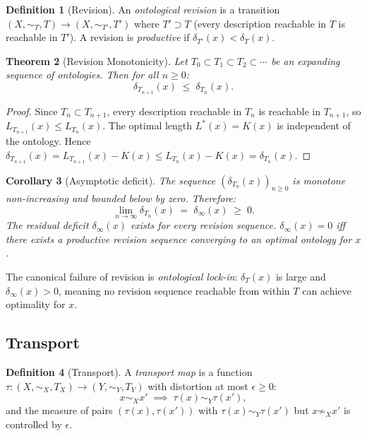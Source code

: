 \documentclass[12pt, a4paper]{article}
\theoremstyle{plain}
\newtheorem{theorem}{Theorem}[section]
\newtheorem{corollary}[theorem]{Corollary}
\theoremstyle{definition}
\newtheorem{definition}[theorem]{Definition}
\theoremstyle{remark}
\newcommand{\eps}{\epsilon}
\begin{document}
\begin{definition}[Revision]
An \emph{ontological revision} is a transition $(X,\sim_T,T)\to(X,\sim_{T'},T')$
where $T'\supset T$ (every description reachable in $T$ is reachable in $T'$).
A revision is \emph{productive} if $\delta_{T'}(x)<\delta_T(x)$.
\end{definition}

\begin{theorem}[Revision Monotonicity]
\label{thm:revision-mono}
Let $T_0\subset T_1\subset T_2\subset\cdots$ be an expanding sequence of
ontologies. Then for all $n\ge 0$:
\[
  \delta_{T_{n+1}}(x) \;\le\; \delta_{T_n}(x).
\]
\end{theorem}

\begin{proof}
Since $T_n\subset T_{n+1}$, every description reachable in $T_n$ is reachable
in $T_{n+1}$, so $L_{T_{n+1}}(x)\le L_{T_n}(x)$. The optimal length
$L^*(x)=K(x)$ is independent of the ontology. Hence
$\delta_{T_{n+1}}(x)=L_{T_{n+1}}(x)-K(x)\le L_{T_n}(x)-K(x)=\delta_{T_n}(x)$.
\end{proof}

\begin{corollary}[Asymptotic deficit]
\label{cor:asymptotic}
The sequence $(\delta_{T_n}(x))_{n\ge 0}$ is monotone non-increasing and
bounded below by zero. Therefore:
\[
  \lim_{n\to\infty}\delta_{T_n}(x) \;=\; \delta_\infty(x) \;\ge\; 0.
\]
The \emph{residual deficit} $\delta_\infty(x)$ exists for every revision
sequence. $\delta_\infty(x)=0$ iff there exists a productive revision
sequence converging to an optimal ontology for $x$.
\end{corollary}

The canonical failure of revision is \emph{ontological lock-in}: $\delta_T(x)$
is large and $\delta_\infty(x)>0$, meaning no revision sequence reachable
from within $T$ can achieve optimality for $x$.

\subsection{Transport}

\begin{definition}[Transport]
\label{def:transport}
A \emph{transport map} is a function
$\tau:(X,\sim_X,T_X)\to(Y,\sim_Y,T_Y)$ with distortion at most $\eps\ge 0$:
\[
  x\sim_X x' \;\implies\; \tau(x)\sim_Y\tau(x'),
\]
and the measure of pairs $(\tau(x),\tau(x'))$ with $\tau(x)\sim_Y\tau(x')$
but $x\not\sim_X x'$ is controlled by $\eps$.
\end{definition}
\end{document}
